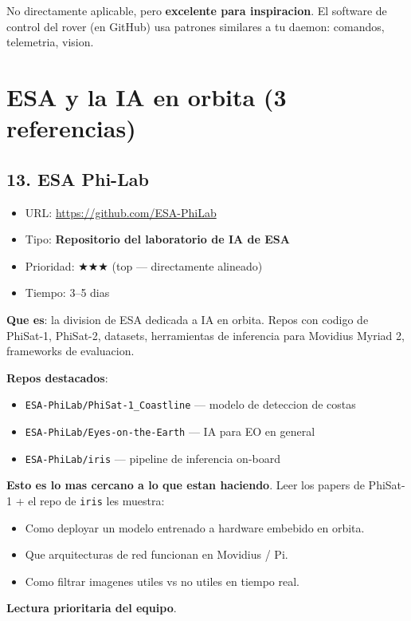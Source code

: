 \documentclass[11pt,a4paper,oneside]{report}
\begin{document}
\begin{nota}
No directamente aplicable, pero \textbf{excelente para inspiracion}. El
software de control del rover (en GitHub) usa patrones similares a tu
daemon: comandos, telemetria, vision.
\end{nota}

\chapter{ESA y la IA en orbita (3 referencias)}

\section{13. ESA Phi-Lab}

\begin{itemize}[leftmargin=1.5em]
  \item URL: \url{https://github.com/ESA-PhiLab}
  \item Tipo: \textbf{Repositorio del laboratorio de IA de ESA}
  \item Prioridad: $\bigstar\bigstar\bigstar$ (top --- directamente alineado)
  \item Tiempo: 3--5 dias
\end{itemize}

\textbf{Que es}: la division de ESA dedicada a IA en orbita. Repos con codigo
de PhiSat-1, PhiSat-2, datasets, herramientas de inferencia para Movidius
Myriad 2, frameworks de evaluacion.

\textbf{Repos destacados}:
\begin{itemize}[leftmargin=2em]
  \item \texttt{ESA-PhiLab/PhiSat-1\_Coastline} --- modelo de deteccion de costas
  \item \texttt{ESA-PhiLab/Eyes-on-the-Earth} --- IA para EO en general
  \item \texttt{ESA-PhiLab/iris} --- pipeline de inferencia on-board
\end{itemize}

\begin{nota}
\textbf{Esto es lo mas cercano a lo que estan haciendo}. Leer los papers
de PhiSat-1 + el repo de \texttt{iris} les muestra:
\begin{itemize}[leftmargin=1em]
  \item Como deployar un modelo entrenado a hardware embebido en orbita.
  \item Que arquitecturas de red funcionan en Movidius / Pi.
  \item Como filtrar imagenes utiles vs no utiles en tiempo real.
\end{itemize}
\textbf{Lectura prioritaria del equipo}.
\end{nota}
\end{document}
